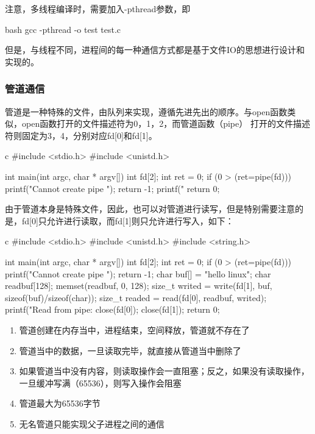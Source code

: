注意，多线程编译时，需要加入-pthread参数，即
\begin{code-block}{bash}
gcc -pthread -o test test.c
\end{code-block}

但是，与线程不同，进程间的每一种通信方式都是基于文件IO的思想进行设计和实现的。
\subsubsection{管道通信}
管道是一种特殊的文件，由队列来实现，遵循先进先出的顺序。与open函数类似，open函数打开的文件描述符为0，1，2，而管道函数（pipe）
打开的文件描述符则固定为3，4，分别对应fd[0]和fd[1]。
\begin{code-block}{c}
#include <stdio.h>
#include <unistd.h>

int main(int argc, char * argv[])
{
        int fd[2];
        int ret = 0;
        if (0 > (ret=pipe(fd)))
        {
                printf("Cannot create pipe \n");
                return -1;
        }
        printf("%
        return 0;
}
\end{code-block}

由于管道本身是特殊文件，因此，也可以对管道进行读写，但是特别需要注意的是，fd[0]只允许进行读取，而fd[1]则只允许进行写入，如下：
\begin{code-block}{c}
#include <stdio.h>
#include <unistd.h>
#include <string.h>

int main(int argc, char * argv[])
{
        int fd[2];
        int ret = 0;
        if (0 > (ret=pipe(fd)))
        {
                printf("Cannot create pipe \n");
                return -1;
        }
        char buf[] = "hello linux";
        char readbuf[128];
        memset(readbuf, 0, 128);
        size_t writed = write(fd[1], buf, sizeof(buf)/sizeof(char));
        size_t readed = read(fd[0], readbuf, writed);
        printf("Read from pipe: %
        close(fd[0]);
        close(fd[1]);
        return 0;
}
\end{code-block}

\begin{enumerate}
  \item 管道创建在内存当中，进程结束，空间释放，管道就不存在了
  \item 管道当中的数据，一旦读取完毕，就直接从管道当中删除了
  \item 如果管道当中没有内容，则读取操作会一直阻塞；反之，如果没有读取操作，一旦缓冲写满（65536），则写入操作会阻塞
  \item 管道最大为65536字节
  \item 无名管道只能实现父子进程之间的通信
\end{enumerate}

